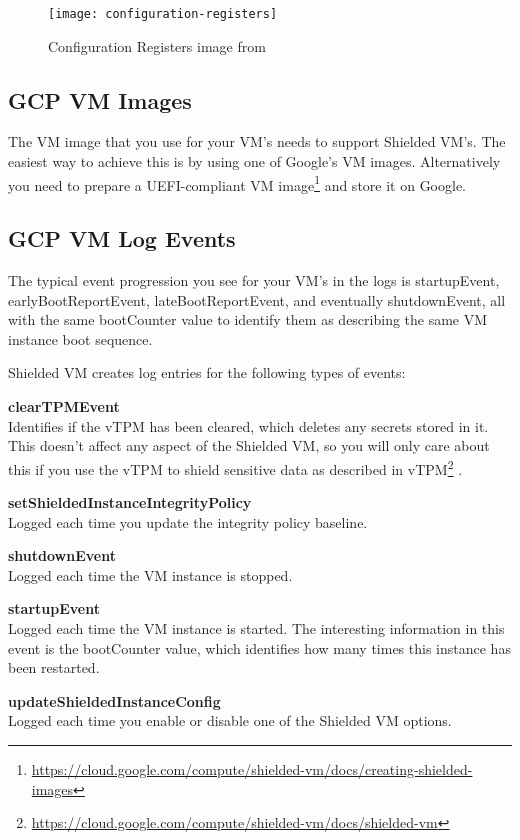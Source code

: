 \begin{figure}[!ht]
    \centering
    \texttt{[image: configuration-registers]}
    \caption{Configuration Registers image from \cite{arthur_platform_2015}}
    \label{fig:configuration-registers}
\end{figure}

\subsection{GCP VM Images}
The VM image that you use for your VM’s needs to support Shielded VM’s. 
The easiest way to achieve this is by using one of Google’s VM images. 
Alternatively you need to prepare a 
UEFI-compliant VM image\footnote{\url{https://cloud.google.com/compute/shielded-vm/docs/creating-shielded-images}} 
and store it on Google.

\subsection{GCP VM Log Events}
The typical event progression you see for your VM’s in the logs is startupEvent, 
earlyBootReportEvent, lateBootReportEvent, and eventually shutdownEvent, 
all with the same bootCounter value to identify them 
as describing the same VM instance boot sequence.

Shielded VM creates log entries for the following types of events:

\textbf{clearTPMEvent}\\
Identifies if the vTPM has been cleared, which deletes any secrets stored in it. 
This doesn't affect any aspect of the Shielded VM, 
so you will only care about this if you use the vTPM 
to shield sensitive data as described in vTPM\footnote{\url{https://cloud.google.com/compute/shielded-vm/docs/shielded-vm}} 
\citep{google_what_2022}.

\textbf{setShieldedInstanceIntegrityPolicy}\\
Logged each time you update the integrity policy baseline.

\textbf{shutdownEvent}\\
Logged each time the VM instance is stopped.

\textbf{startupEvent}\\
Logged each time the VM instance is started. 
The interesting information in this event is the bootCounter value, 
which identifies how many times this instance has been restarted.

\textbf{updateShieldedInstanceConfig}\\
Logged each time you enable or disable one of the Shielded VM options.

